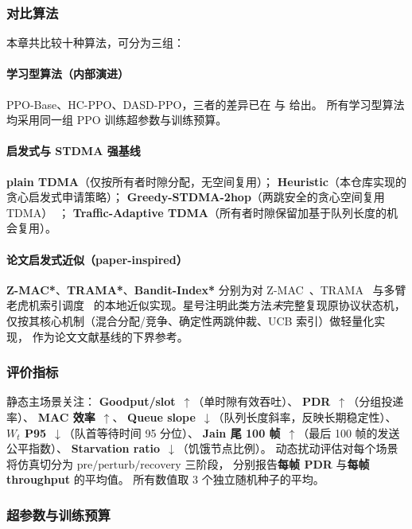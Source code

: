 \subsubsection{对比算法}

本章共比较十种算法，可分为三组：

\paragraph{学习型算法（内部演进）}
PPO-Base、HC-PPO、DASD-PPO，三者的差异已在 
与  给出。
所有学习型算法均采用同一组 PPO 训练超参数与训练预算。

\paragraph{启发式与 STDMA 强基线}
\textbf{plain TDMA}（仅按所有者时隙分配，无空间复用）；
\textbf{Heuristic}（本仓库实现的贪心启发式申请策略）；
\textbf{Greedy-STDMA-2hop}（两跳安全的贪心空间复用 TDMA）~\cite{stdma}；
\textbf{Traffic-Adaptive TDMA}（所有者时隙保留加基于队列长度的机会复用）。

\paragraph{论文启发式近似（paper-inspired）}
\textbf{Z-MAC*}、\textbf{TRAMA*}、\textbf{Bandit-Index*} 分别为对
Z-MAC~\cite{zmac}、TRAMA~\cite{trama} 与多臂老虎机索引调度~\cite{bandit}
的本地近似实现。星号注明此类方法\emph{未}完整复现原协议状态机，
仅按其核心机制（混合分配/竞争、确定性两跳仲裁、UCB 索引）做轻量化实现，
作为论文文献基线的下界参考。

\subsubsection{评价指标}

静态主场景关注：
\textbf{Goodput/slot}~$\uparrow$（单时隙有效吞吐）、
\textbf{PDR}~$\uparrow$（分组投递率）、
\textbf{MAC 效率}~$\uparrow$、
\textbf{Queue slope}~$\downarrow$（队列长度斜率，反映长期稳定性）、
\textbf{$W_t$ P95}~$\downarrow$（队首等待时间 95 分位）、
\textbf{Jain 尾 100 帧}~$\uparrow$（最后 100 帧的发送公平指数）、
\textbf{Starvation ratio}~$\downarrow$（饥饿节点比例）。
动态扰动评估对每个场景将仿真切分为
$\mathrm{pre}/\mathrm{perturb}/\mathrm{recovery}$ 三阶段，
分别报告\textbf{每帧 PDR} 与\textbf{每帧 throughput} 的平均值。
所有数值取 3 个独立随机种子的平均。

\subsubsection{超参数与训练预算}

